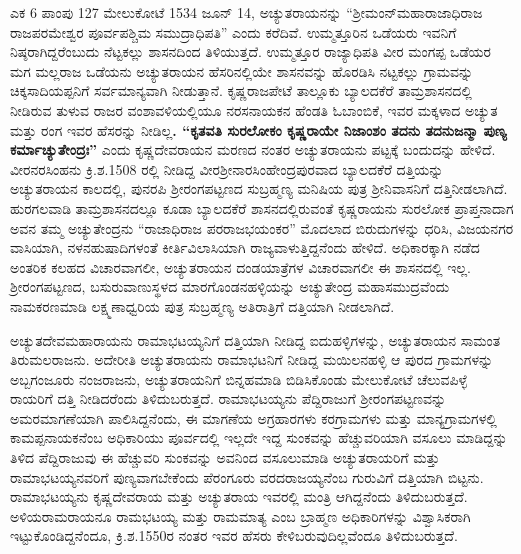 {ಎಕ 6 ಪಾಂಪು 127 ಮೇಲುಕೋಟೆ 1534 ಜೂನ್​ 14}, ಅಚ್ಯುತರಾಯನನ್ನು “ಶ‍್ರೀಮಂನ್​ ಮಹಾರಾಜಾಧಿರಾಜ ರಾಜಪರಮೇಶ್ವರ ಪೂರ್ವಪಶ್ಚಿಮ ಸಮುದ್ರಾಧಿಪತಿ” ಎಂದು ಕರೆದಿವೆ. ಉಮ್ಮತ್ತೂರಿನ ಒಡೆಯರು ಇವನಿಗೆ ನಿಷ್ಠರಾಗಿದ್ದರೆಂಬುದು ನೆಟ್ಟಕಲ್ಲು ಶಾಸನದಿಂದ ತಿಳಿಯುತ್ತದೆ. ಉಮ್ಮತ್ತೂರ ರಾಜ್ಯಾಧಿಪತಿ ವೀರ ಮಂಗಪ್ಪ ಒಡೆಯರ ಮಗ ಮಲ್ಲರಾಜ ಒಡೆಯನು ಅಚ್ಯುತರಾಯನ ಹೆಸರಿನಲ್ಲಿಯೇ ಶಾಸನವನ್ನು ಹೊರಡಿಸಿ ನಟ್ಟಕಲ್ಲು ಗ್ರಾಮವನ್ನು ಚಿಕ್ಕಸಾದಿಯಪ್ಪನಿಗೆ ಸರ್ವಮಾನ್ಯವಾಗಿ ನೀಡುತ್ತಾನೆ. ಕೃಷ್ಣರಾಜಪೇಟೆ ತಾಲ್ಲೂಕು ಬ್ಯಾಲದಕೆರೆ ತಾಮ್ರಶಾಸನದಲ್ಲಿ ನೀಡಿರುವ ತುಳುವ ರಾಜರ ವಂಶಾವಳಿಯಲ್ಲಿಯೂ ನರಸನಾಯಕನ ಹೆಂಡತಿ ಓಬಾಂಬಿಕೆ, ಇವರ ಮಕ್ಕಳಾದ ಅಚ್ಯುತ ಮತ್ತು ರಂಗ ಇವರ ಹೆಸರನ್ನು ನೀಡಿಲ್ಲ\textbf{. “ಕೃತವತಿ ಸುರಲೋಕಂ ಕೃಷ್ಣರಾಯೇ ನಿಜಾಂಶಂ ತದನು ತದನುಜನ್ಮಾ ಪುಣ್ಯ ಕರ್ಮಾಚ್ಯುತೇಂದ್ರಃ”} ಎಂದು ಕೃಷ್ಣದೇವರಾಯನ ಮರಣದ ನಂತರ ಅಚ್ಯುತರಾಯನು ಪಟ್ಟಕ್ಕೆ ಬಂದುದನ್ನು ಹೇಳಿದೆ. ವೀರನರಸಿಂಹನು ಕ್ರಿ.ಶ.1508 ರಲ್ಲಿ ನೀಡಿದ್ದ ವೀರಶ‍್ರೀನಾರಸಿಂಹೇಂದ್ರಪುರವಾದ ಬ್ಯಾಲದಕೆರೆ ದತ್ತಿಯನ್ನು ಅಚ್ಯುತರಾಯನ ಕಾಲದಲ್ಲಿ, ಪುನರಪಿ ಶ‍್ರೀರಂಗಪಟ್ಟಣದ ಸುಬ್ರಹ್ಮಣ್ಯ ಮನಿಷಿಯ ಪುತ್ರ ಶ‍್ರೀನಿವಾಸನಿಗೆ ದತ್ತಿನೀಡಲಾಗಿದೆ. ಹುರಗಲವಾಡಿ ತಾಮ್ರಶಾಸನದಲ್ಲೂ ಕೂಡಾ ಬ್ಯಾಲದಕೆರೆ ಶಾಸನದಲ್ಲಿರುವಂತೆ ಕೃಷ್ಣರಾಯನು ಸುರಲೋಕ ಪ್ರಾಪ್ತನಾದಾಗ ಅವನ ತಮ್ಮ ಅಚ್ಯುತೇಂದ್ರನು “ರಾಜಾಧಿರಾಜ ಪರರಾಜಭಯಂಕರ” ಮೊದಲಾದ ಬಿರುದುಗಳನ್ನು ಧರಿಸಿ, ವಿಜಯನಗರ ವಾಸಿಯಾಗಿ, ನಳನಹುಷಾದಿಗಳಂತೆ ಕೀರ್ತಿವಿಲಾಸಿಯಾಗಿ ರಾಜ್ಯವಾಳುತ್ತಿದ್ದನೆಂದು ಹೇಳಿದೆ. ಅಧಿಕಾರಕ್ಕಾಗಿ ನಡೆದ ಅಂತರಿಕ ಕಲಹದ ವಿಚಾರವಾಗಲೀ, ಅಚ್ಯುತರಾಯನ ದಂಡಯಾತ್ರೆಗಳ ವಿಚಾರವಾಗಲೀ ಈ ಶಾಸನದಲ್ಲಿ ಇಲ್ಲ. ಶ‍್ರೀರಂಗಪಟ್ಟಣದ, ಬಸುರುವಾಣುಸ್ಥಳದ ಮಾರಗೊಂಡನಹಳ್ಳಿಯನ್ನು ಅಚ್ಯುತೇಂದ್ರ ಮಹಾಸಮುದ್ರವೆಂದು ನಾಮಕರಣಮಾಡಿ ಲಕ್ಷ್ಮಣಾಧ್ವರಿಯ ಪುತ್ರ ಸುಬ್ರಹ್ಮಣ್ಯ ಅತಿರಾತ್ರಿಗೆ ದತ್ತಿಯಾಗಿ ನೀಡಲಾಗಿದೆ.

ಅಚ್ಯುತದೇವಮಹಾರಾಯನು ರಾಮಾಭಟಯ್ಯನಿಗೆ ದತ್ತಿಯಾಗಿ ನೀಡಿದ್ದ ಐದುಹಳ್ಳಿಗಳನ್ನು, ಅಚ್ಯುತರಾಯನ ಸಾಮಂತ ತಿರುಮಲರಾಜನು. ಅದೇರೀತಿ ಅಚ್ಯುತರಾಯನು ರಾಮಾಭಟನಿಗೆ ನೀಡಿದ್ದ ಮಯಿಲನಹಳ್ಳಿ ಆ ಪುರದ ಗ್ರಾಮಗಳನ್ನು ಅಬ್ಬಗಂಜೂರು ನಂಜರಾಜನು, ಅಚ್ಯುತರಾಯನಿಗೆ ಬಿನ್ನಹಮಾಡಿ ಬಿಡಿಸಿಕೊಂಡು ಮೇಲುಕೋಟೆ ಚೆಲುವಪಿಳ್ಳೆ ರಾಯರಿಗೆ ದತ್ತಿ ನೀಡಿದರೆಂದು ತಿಳಿದುಬರುತ್ತದೆ. ರಾಮಾಭಟಯ್ಯನು ಪೆದ್ದಿರಾಜುಗೆ ಶ‍್ರೀರಂಗಪಟ್ಟಣವನ್ನು ಅಮರಮಾಗಣೆಯಾಗಿ ಪಾಲಿಸಿದ್ದನೆಂದು, ಈ ಮಾಗಣೆಯ ಅಗ್ರಹಾರಗಳು ಕರಗ್ರಾಮಗಳು ಮತ್ತು ಮಾನ್ಯಗ್ರಾಮಗಳಲ್ಲಿ ಕಾಮಪ್ಪನಾಯಕನೆಂಬ ಅಧಿಕಾರಿಯು ಪೂರ್ವದಲ್ಲಿ ಇಲ್ಲದೇ ಇದ್ದ ಸುಂಕವನ್ನು ಹೆಚ್ಚುವರಿಯಾಗಿ ವಸೂಲು ಮಾಡಿದ್ದನ್ನು ತಿಳಿದ ಪೆದ್ದಿರಾಜುವು ಈ ಹೆಚ್ಚುವರಿ ಸುಂಕವನ್ನು ಅವನಿಂದ ವಸೂಲುಮಾಡಿ ಅಚ್ಯುತರಾಯರಿಗೆ ಮತ್ತು ರಾಮಾಭಟಯ್ಯನವರಿಗೆ ಪುಣ್ಯವಾಗಬೇಕೆಂದು ಪೆರಂಗೂರು ವರದರಾಜಯ್ಯನೆಂಬ ಗುರುವಿಗೆ ದತ್ತಿಯಾಗಿ ಬಿಟ್ಟನು. ರಾಮಾಭಟಯ್ಯನು ಕೃಷ್ಣದೇವರಾಯ ಮತ್ತು ಅಚ್ಯುತರಾಯ ಇವರಲ್ಲಿ ಮಂತ್ರಿ ಆಗಿದ್ದನೆಂದು ತಿಳಿದುಬರುತ್ತದೆ. ಅಳಿಯರಾಮರಾಯನೂ ರಾಮಭಟಯ್ಯ ಮತ್ತು ರಾಮಮಾತ್ಯ ಎಂಬ ಬ್ರಾಹ್ಮಣ ಅಧಿಕಾರಿಗಳನ್ನು ವಿಶ್ವಾಸಿಕರಾಗಿ ಇಟ್ಟುಕೊಂಡಿದ್ದನೆಂದೂ, ಕ್ರಿ.ಶ.1550ರ ನಂತರ ಇವರ ಹೆಸರು ಕೇಳಿಬರುವುದಿಲ್ಲವೆಂದೂ ತಿಳಿದುಬರುತ್ತದೆ.

